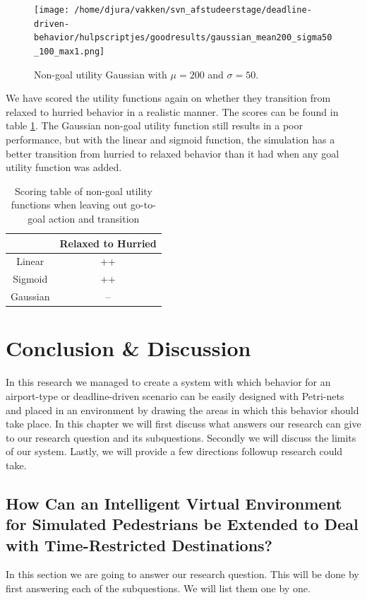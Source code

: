 \documentclass[11pt, a4paper]{book}
\begin{document}
\begin{figure}
\centering
\texttt{[image: /home/djura/vakken/svn\_afstudeerstage/deadline-driven-behavior/hulpscriptjes/goodresults/gaussian\_mean200\_sigma50\_100\_max1.png]}
\caption{Non-goal utility Gaussian with $\mu=200$ and $\sigma=50$.}
\label{fig:Gaussian_mean200_sigma50_100_max1}
\end{figure}

We have scored the utility functions again on whether they transition from relaxed to hurried behavior in a realistic manner. The scores can be found in table \ref{tab:secondquantitativetable}. The Gaussian non-goal utility function still results in a poor performance, but with the linear and sigmoid function, the simulation has a better transition from hurried to relaxed behavior than it had when any goal utility function was added.

\begin{table}
\centering
\begin{tabular}{|c|c|}
\hline 
 & Relaxed to Hurried\\ 
\hline 
Linear & ++  \\ 
\hline 
Sigmoid & ++  \\ 
\hline 
Gaussian & --\\
\hline
\end{tabular} 
\caption{Scoring table of non-goal utility functions when leaving out go-to-goal action and transition}
\label{tab:secondquantitativetable}
\end{table}

\chapter{Conclusion \& Discussion}
\label{chap:conclusiondiscusssion}
In this research we managed to create a system with which behavior for an airport-type or deadline-driven scenario can be easily designed with Petri-nets and placed in an environment by drawing the areas in which this behavior should take place. In this chapter we will first discuss what answers our research can give to our research question and its subquestions. Secondly we will discuss the limits of our system. Lastly, we will provide a few directions followup research could take.

\section{How Can an Intelligent Virtual Environment for Simulated Pedestrians be Extended to Deal with Time-Restricted Destinations?}
In this section we are going to answer our research question. This will be done by first answering each of the subquestions. We will list them one by one.
\end{document}
